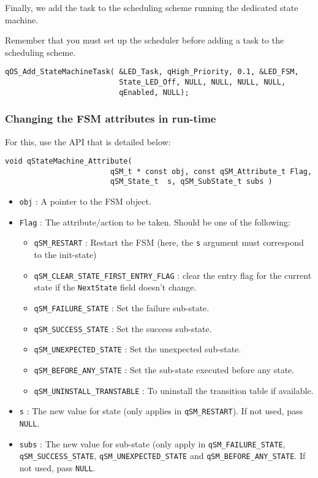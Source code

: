 

Finally, we add the task to the scheduling scheme running the dedicated state machine.

Remember that you must set up the scheduler before adding a task to the scheduling scheme.
\medskip

\begin{lstlisting}[style=CStyle]
qOS_Add_StateMachineTask( &LED_Task, qHigh_Priority, 0.1, &LED_FSM,
                          State_LED_Off, NULL, NULL, NULL, NULL,
                          qEnabled, NULL);
\end{lstlisting}

\subsubsection{Changing the FSM attributes in run-time}
For this, use the API  that is detailed below:
\medskip

\begin{lstlisting}[style=CStyle]
void qStateMachine_Attribute( 
                        qSM_t * const obj, const qSM_Attribute_t Flag, 
                        qSM_State_t  s, qSM_SubState_t subs )
\end{lstlisting}

\begin{itemize}
    \item \lstinline{obj} : A pointer to the FSM object.
    \item \lstinline{Flag} : The attribute/action to be taken. Should be one of the following:
    \begin{itemize}
        \item \lstinline{qSM_RESTART} : Restart the FSM (here, the \lstinline{s} argument must correspond to the init-state)
        \item \lstinline{qSM_CLEAR_STATE_FIRST_ENTRY_FLAG} : clear the entry flag for the current state if the \lstinline{NextState} field doesn't change.
        \item \lstinline{qSM_FAILURE_STATE} : Set the failure sub-state.
        \item \lstinline{qSM_SUCCESS_STATE} : Set the success sub-state.
        \item \lstinline{qSM_UNEXPECTED_STATE} : Set the unexpected sub-state.
        \item \lstinline{qSM_BEFORE_ANY_STATE} : Set the sub-state executed before any state.
        \item \lstinline{qSM_UNINSTALL_TRANSTABLE} : To uninstall the transition table if available.
    \end{itemize}
    \item \lstinline{s} : The new value for state (only applies in \lstinline{qSM_RESTART}). If not used, pass \lstinline{NULL}.
    \item \lstinline{subs} : The new value for sub-state (only apply in \lstinline{qSM_FAILURE_STATE}, \lstinline{qSM_SUCCESS_STATE}, \lstinline{qSM_UNEXPECTED_STATE} and \lstinline{qSM_BEFORE_ANY_STATE}. If not used, pass \lstinline{NULL}.
\end{itemize}

